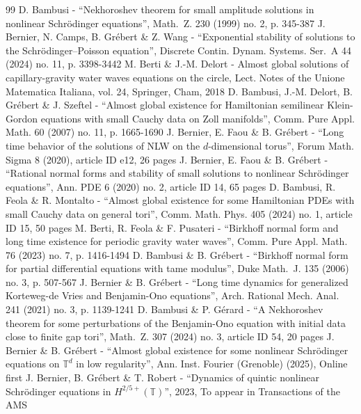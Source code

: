 \documentclass[10pt,a4paper]{amsart}
\theoremstyle{plain}
\theoremstyle{definition}
\newcommand{\1}{\mathbf{1}}
\begin{document}
\begin{thebibliography}{99}
 D. Bambusi - “Nekhoroshev theorem for small amplitude solutions in nonlinear Schrödinger equations”, Math. Z. 230 (1999) no. 2, p. 345-387
 J. Bernier, N. Camps, B. Grébert \& Z. Wang - “Exponential stability of solutions to the Schrödinger–Poisson equation”, Discrete Contin. Dynam. Systems. Ser. A 44 (2024) no. 11, p. 3398-3442
 M. Berti \& J.-M. Delort - Almost global solutions of capillary-gravity water waves equations on the circle, Lect. Notes of the Unione Matematica Italiana, vol. 24, Springer, Cham, 2018
 D. Bambusi, J.-M. Delort, B. Grébert \& J. Szeftel - “Almost global existence for Hamiltonian semilinear Klein-Gordon equations with small Cauchy data on Zoll manifolds”, Comm. Pure Appl. Math. 60 (2007) no. 11, p. 1665-1690
 J. Bernier, E. Faou \& B. Grébert - “Long time behavior of the solutions of NLW on the $d$-dimensional torus”, Forum Math. Sigma 8 (2020), article ID e12, 26 pages
 J. Bernier, E. Faou \& B. Grébert - “Rational normal forms and stability of small solutions to nonlinear Schrödinger equations”, Ann. PDE 6 (2020) no. 2, article ID 14, 65 pages
 D. Bambusi, R. Feola \& R. Montalto - “Almost global existence for some Hamiltonian PDEs with small Cauchy data on general tori”, Comm. Math. Phys. 405 (2024) no. 1, article ID 15, 50 pages
 M. Berti, R. Feola \& F. Pusateri - “Birkhoff normal form and long time existence for periodic gravity water waves”, Comm. Pure Appl. Math. 76 (2023) no. 7, p. 1416-1494
 D. Bambusi \& B. Grébert - “Birkhoff normal form for partial differential equations with tame modulus”, Duke Math. J. 135 (2006) no. 3, p. 507-567
 J. Bernier \& B. Grébert - “Long time dynamics for generalized Korteweg-de Vries and Benjamin-Ono equations”, Arch. Rational Mech. Anal. 241 (2021) no. 3, p. 1139-1241
 D. Bambusi \& P. Gérard - “A Nekhoroshev theorem for some perturbations of the Benjamin-Ono equation with initial data close to finite gap tori”, Math. Z. 307 (2024) no. 3, article ID 54, 20 pages
 J. Bernier \& B. Grébert - “Almost global existence for some nonlinear Schrödinger equations on $\mathbb{T}^d$ in low regularity”, Ann. Inst. Fourier (Grenoble) (2025), Online first
 J. Bernier, B. Grébert \& T. Robert - “Dynamics of quintic nonlinear Schrödinger equations in $H^{2/5+}(\mathbb{T})$”, 2023, To appear in Transactions of the AMS

\end{thebibliography}
\end{document}
